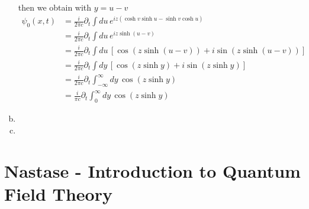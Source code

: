 \documentclass[10pt,a4paper]{book}
\theoremstyle{definition}
\begin{document}
\begin{enumerate}[(a)]
then we obtain with $y=u-v$
\begin{align}
\psi_0(x,t)
&=\frac{i}{2\pi c}\partial_t\int du\,e^{iz(\cosh v\sinh u-\sinh v\cosh u)}\\
&=\frac{i}{2\pi c}\partial_t\int du\,e^{iz\sinh (u-v)}\\
&=\frac{i}{2\pi c}\partial_t\int du\,\left[\cos(z\sinh (u-v))+i\sin(z\sinh (u-v))\right]\\
&=\frac{i}{2\pi c}\partial_t\int dy\,\left[\cos(z\sinh y)+i\sin(z\sinh y)\right]\\
&=\frac{i}{2\pi c}\partial_t\int_{-\infty}^\infty dy\,\cos(z\sinh y)\\
&=\frac{i}{\pi c}\partial_t\int_0^\infty dy\,\cos(z\sinh y)
\end{align}



\item

\item

\end{enumerate}

\section{{\sc Nastase} - Introduction to Quantum Field Theory} 
\end{document}
